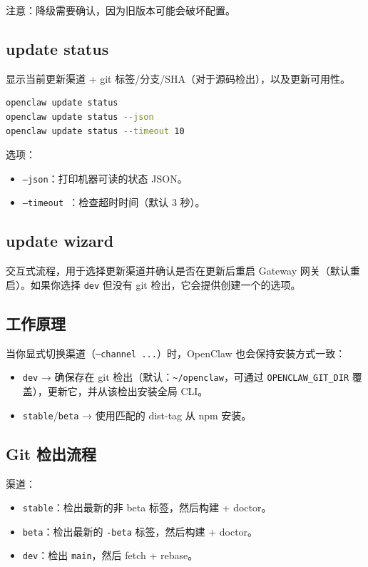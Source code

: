 注意：降级需要确认，因为旧版本可能会破坏配置。

\subsection{update status}


显示当前更新渠道 + git 标签/分支/SHA（对于源码检出），以及更新可用性。

\begin{lstlisting}[language=bash]
openclaw update status
openclaw update status --json
openclaw update status --timeout 10
\end{lstlisting}


选项：

\begin{itemize}
  \item \texttt{--json}：打印机器可读的状态 JSON。
  \item \texttt{--timeout }：检查超时时间（默认 3 秒）。
\end{itemize}


\subsection{update wizard}


交互式流程，用于选择更新渠道并确认是否在更新后重启 Gateway 网关（默认重启）。如果你选择 \texttt{dev} 但没有 git 检出，它会提供创建一个的选项。

\subsection{工作原理}


当你显式切换渠道（\texttt{--channel ...}）时，OpenClaw 也会保持安装方式一致：

\begin{itemize}
  \item \texttt{dev} → 确保存在 git 检出（默认：\texttt{\textasciitilde{}/openclaw}，可通过 \texttt{OPENCLAW\_GIT\_DIR} 覆盖），更新它，并从该检出安装全局 CLI。
  \item \texttt{stable}/\texttt{beta} → 使用匹配的 dist-tag 从 npm 安装。
\end{itemize}


\subsection{Git 检出流程}


渠道：

\begin{itemize}
  \item \texttt{stable}：检出最新的非 beta 标签，然后构建 + doctor。
  \item \texttt{beta}：检出最新的 \texttt{-beta} 标签，然后构建 + doctor。
  \item \texttt{dev}：检出 \texttt{main}，然后 fetch + rebase。
\end{itemize}


